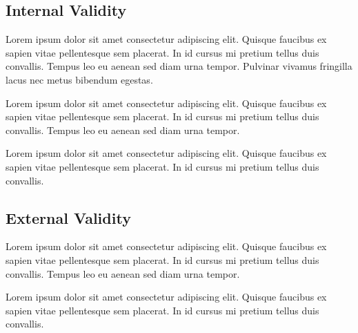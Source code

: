 \documentclass[sigconf,nonacm]{acmart} %
\begin{document}
\subsection{Internal Validity}
\label{subsec:internal_validity}

Lorem ipsum dolor sit amet consectetur adipiscing elit. 
Quisque faucibus ex sapien vitae pellentesque sem placerat. 
In id cursus mi pretium tellus duis convallis. 
Tempus leo eu aenean sed diam urna tempor. 
Pulvinar vivamus fringilla lacus nec metus bibendum egestas. 

Lorem ipsum dolor sit amet consectetur adipiscing elit. 
Quisque faucibus ex sapien vitae pellentesque sem placerat. 
In id cursus mi pretium tellus duis convallis. 
Tempus leo eu aenean sed diam urna tempor. 

Lorem ipsum dolor sit amet consectetur adipiscing elit. 
Quisque faucibus ex sapien vitae pellentesque sem placerat. 
In id cursus mi pretium tellus duis convallis. 

\subsection{External Validity}
\label{subsec:external_validity}

Lorem ipsum dolor sit amet consectetur adipiscing elit. 
Quisque faucibus ex sapien vitae pellentesque sem placerat. 
In id cursus mi pretium tellus duis convallis. 
Tempus leo eu aenean sed diam urna tempor. 

Lorem ipsum dolor sit amet consectetur adipiscing elit. 
Quisque faucibus ex sapien vitae pellentesque sem placerat. 
In id cursus mi pretium tellus duis convallis. 
\end{document}
